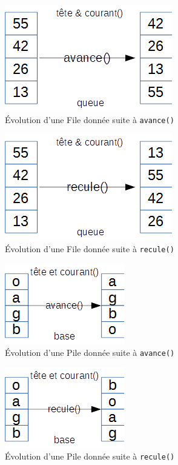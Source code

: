 \documentclass{article}
\newcommand{\info}{\texttt}
\begin{document}
\begin{figure}[H]
    \begin{center}
        \includegraphics[scale=0.75]{SchemaAvanceFile}
        \caption{\label{SchemaAvanceFile} Évolution d'une File donnée suite à \info{avance()}}
    \end{center}
\end{figure}
\begin{figure}[H]
    \begin{center}
        \includegraphics[scale=0.75]{SchemaReculeFile}
        \caption{\label{SchemaReculeFile} Évolution d'une File donnée suite à \info{recule()}}
    \end{center}
\end{figure}
\begin{figure}[H]
    \begin{center}
        \includegraphics{SchemaAvancePile}
        \caption{\label{SchemaAvancePile} Évolution d'une Pile donnée suite à \info{avance()}}
    \end{center}
\end{figure}
\begin{figure}[H]
    \begin{center}
        \includegraphics{SchemaReculePile}
        \caption{\label{SchemaReculePile} Évolution d'une Pile donnée suite à \info{recule()}}
    \end{center}
\end{figure}


\newpage
\tableofcontents
\end{document}
